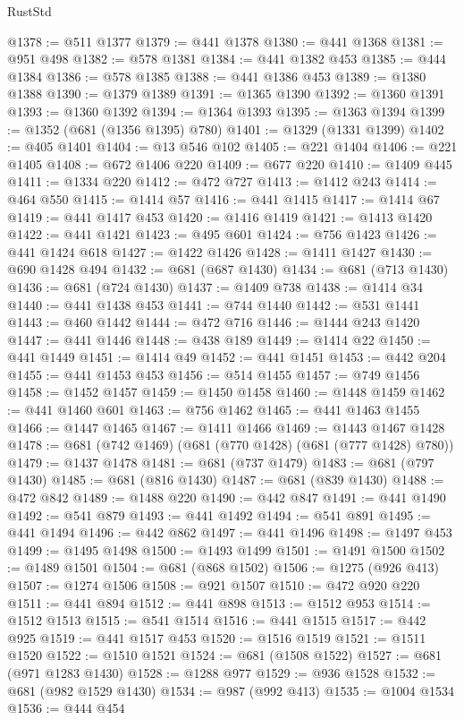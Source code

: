 \begin{lexlean}{RustStd}
\begin{coremodule}
{\begin{coremodule}
{{{{{{{{{{{{{{{{{{{{{{{{{{@1378 := @511 @1377
@1379 := @441 @1378
@1380 := @441 @1368
@1381 := @951 @498
@1382 := @578 @1381
@1384 := @441 @1382 @453
@1385 := @444 @1384
@1386 := @578 @1385
@1388 := @441 @1386 @453
@1389 := @1380 @1388
@1390 := @1379 @1389
@1391 := @1365 @1390
@1392 := @1360 @1391
@1393 := @1360 @1392
@1394 := @1364 @1393
@1395 := @1363 @1394
@1399 := @1352 (@681 (@1356 @1395) @780)
@1401 := @1329 (@1331 @1399)
@1402 := @405 @1401
@1404 := @13 @546 @102
@1405 := @221 @1404
@1406 := @221 @1405
@1408 := @672 @1406 @220
@1409 := @677 @220
@1410 := @1409 @445
@1411 := @1334 @220
@1412 := @472 @727
@1413 := @1412 @243
@1414 := @464 @550
@1415 := @1414 @57
@1416 := @441 @1415
@1417 := @1414 @67
@1419 := @441 @1417 @453
@1420 := @1416 @1419
@1421 := @1413 @1420
@1422 := @441 @1421
@1423 := @495 @601
@1424 := @756 @1423
@1426 := @441 @1424 @618
@1427 := @1422 @1426
@1428 := @1411 @1427
@1430 := @690 @1428 @494
@1432 := @681 (@687 @1430)
@1434 := @681 (@713 @1430)
@1436 := @681 (@724 @1430)
@1437 := @1409 @738
@1438 := @1414 @34
@1440 := @441 @1438 @453
@1441 := @744 @1440
@1442 := @531 @1441
@1443 := @460 @1442
@1444 := @472 @716
@1446 := @1444 @243 @1420
@1447 := @441 @1446
@1448 := @438 @189
@1449 := @1414 @22
@1450 := @441 @1449
@1451 := @1414 @49
@1452 := @441 @1451
@1453 := @442 @204
@1455 := @441 @1453 @453
@1456 := @514 @1455
@1457 := @749 @1456
@1458 := @1452 @1457
@1459 := @1450 @1458
@1460 := @1448 @1459
@1462 := @441 @1460 @601
@1463 := @756 @1462
@1465 := @441 @1463 @1455
@1466 := @1447 @1465
@1467 := @1411 @1466
@1469 := @1443 @1467 @1428
@1478 := @681 (@742 @1469) (@681 (@770 @1428) (@681 (@777 @1428) @780))
@1479 := @1437 @1478
@1481 := @681 (@737 @1479)
@1483 := @681 (@797 @1430)
@1485 := @681 (@816 @1430)
@1487 := @681 (@839 @1430)
@1488 := @472 @842
@1489 := @1488 @220
@1490 := @442 @847
@1491 := @441 @1490
@1492 := @541 @879
@1493 := @441 @1492
@1494 := @541 @891
@1495 := @441 @1494
@1496 := @442 @862
@1497 := @441 @1496
@1498 := @1497 @453
@1499 := @1495 @1498
@1500 := @1493 @1499
@1501 := @1491 @1500
@1502 := @1489 @1501
@1504 := @681 (@868 @1502)
@1506 := @1275 (@926 @413)
@1507 := @1274 @1506
@1508 := @921 @1507
@1510 := @472 @920 @220
@1511 := @441 @894
@1512 := @441 @898
@1513 := @1512 @953
@1514 := @1512 @1513
@1515 := @541 @1514
@1516 := @441 @1515
@1517 := @442 @925
@1519 := @441 @1517 @453
@1520 := @1516 @1519
@1521 := @1511 @1520
@1522 := @1510 @1521
@1524 := @681 (@1508 @1522)
@1527 := @681 (@971 @1283 @1430)
@1528 := @1288 @977
@1529 := @936 @1528
@1532 := @681 (@982 @1529 @1430)
@1534 := @987 (@992 @413)
@1535 := @1004 @1534
@1536 := @444 @454
}}}}}}}}}}}}}}}}}}}}}}}}}}
\end{coremodule}}
\end{coremodule}
\end{lexlean}
